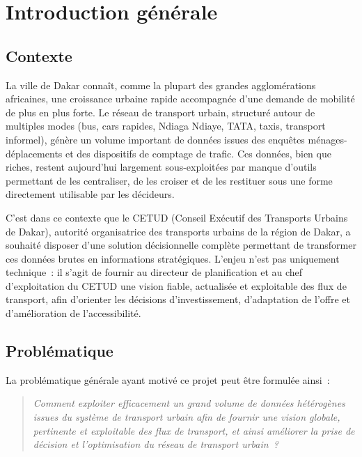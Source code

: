 \chapter*{Introduction générale}

\section*{Contexte}
La ville de Dakar connaît, comme la plupart des grandes agglomérations africaines, une croissance urbaine rapide accompagnée d'une demande de mobilité de plus en plus forte. Le réseau de transport urbain, structuré autour de multiples modes (bus, cars rapides, Ndiaga Ndiaye, TATA, taxis, transport informel), génère un volume important de données issues des enquêtes ménages-déplacements et des dispositifs de comptage de trafic. Ces données, bien que riches, restent aujourd'hui largement sous-exploitées par manque d'outils permettant de les centraliser, de les croiser et de les restituer sous une forme directement utilisable par les décideurs.

C'est dans ce contexte que le CETUD (Conseil Exécutif des Transports Urbains de Dakar), autorité organisatrice des transports urbains de la région de Dakar, a souhaité disposer d'une solution décisionnelle complète permettant de transformer ces données brutes en informations stratégiques. L'enjeu n'est pas uniquement technique~: il s'agit de fournir au directeur de planification et au chef d'exploitation du CETUD une vision fiable, actualisée et exploitable des flux de transport, afin d'orienter les décisions d'investissement, d'adaptation de l'offre et d'amélioration de l'accessibilité.

\section*{Problématique}
La problématique générale ayant motivé ce projet peut être formulée ainsi~:

\begin{quote}
\textit{Comment exploiter efficacement un grand volume de données hétérogènes issues du système de transport urbain afin de fournir une vision globale, pertinente et exploitable des flux de transport, et ainsi améliorer la prise de décision et l'optimisation du réseau de transport urbain~?}
\end{quote}

